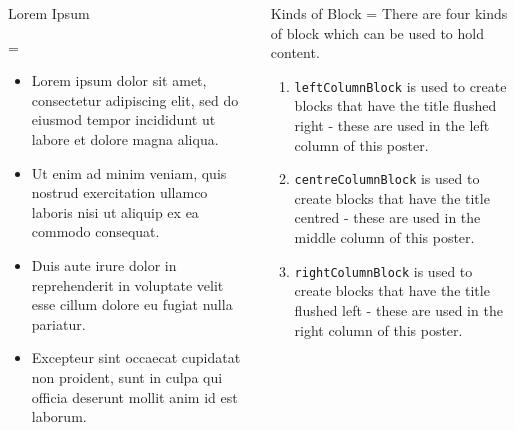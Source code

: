 \documentclass[final,hyperref={pdfpagelabels=false}]{beamer}
\newcommand{\correctitemizeindent}{\setlength{\leftmargini}{2.5em}}
\newlength{\columnheight}
\begin{document}
\begin{frame}
\begin{columns}[T]
\begin{column}{.32\textwidth}
\begin{minipage}[t]{.95\textwidth}
{		\begin{leftColumnBlock}{Lorem Ipsum}
		{
			\rightskip=\leftskip
			{\correctitemizeindent
			\begin{itemize}
				\item Lorem ipsum dolor sit amet, consectetur adipiscing elit, sed do eiusmod tempor incididunt ut labore et dolore magna aliqua.
				\item Ut enim ad minim veniam, quis nostrud exercitation ullamco laboris nisi ut aliquip ex ea commodo consequat.
				\item Duis aute irure dolor in reprehenderit in voluptate velit esse cillum dolore eu fugiat nulla pariatur.
				\item Excepteur sint occaecat cupidatat non proident, sunt in culpa qui officia deserunt mollit anim id est laborum.
			\end{itemize}
			}
		}	
		\end{leftColumnBlock}
			
		} %
		\end{minipage}
	\end{column}


		
	\begin{column}{.32\textwidth}
		\begin{minipage}[t]{.95\textwidth}
		\parbox[t][\columnheight]{\textwidth}{	  	
	  
		\begin{centreColumnBlock}{Kinds of Block}
			\rightskip=\leftskip
			There are four kinds of block which can be used to hold content.		
			\correctitemizeindent
			\begin{enumerate}
				\item \texttt{leftColumnBlock} is used to create blocks that have the title flushed right - these are used in the left column of this poster.
				\item \texttt{centreColumnBlock} is used to create blocks that have the title centred - these are used in the middle column of this poster.
				\item \texttt{rightColumnBlock} is used to create blocks that have the title flushed left - these are used in the right column of this poster.
			\end{enumerate}
			
		\end{centreColumnBlock}

		\vfill

}
\end{minipage}
\end{column}
\end{columns}
\end{frame}
\end{document}
